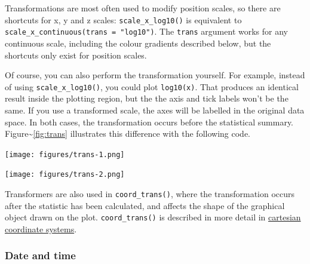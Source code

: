 Transformations are most often used to modify position scales, so there
are shortcuts for x, y and z scales: \texttt{scale\_x\_log10()} is
equivalent to \texttt{scale\_x\_continuous(trans = "log10")}. The
\texttt{trans} argument works for any continuous scale, including the
colour gradients described below, but the shortcuts only exist for
position scales.  

Of course, you can also perform the transformation yourself. For
example, instead of using \texttt{scale\_x\_log10()}, you could plot
\texttt{log10(x)}. That produces an identical result inside the plotting
region, but the the axis and tick labels won't be the same. If you use a
transformed scale, the axes will be labelled in the original data space.
In both cases, the transformation occurs before the statistical summary.
Figure\textasciitilde{}\ref{fig:trans} illustrates this difference with
the following code. 

\begin{Shaded}
\begin{Highlighting}[]
\NormalTok{(} 
\end{Highlighting}
\end{Shaded}

\texttt{[image: figures/trans-1.png]}

\begin{Shaded}
\begin{Highlighting}[]
 \StringTok{ }
\StringTok{  }\NormalTok{() +}\StringTok{ }\NormalTok{()}
\end{Highlighting}
\end{Shaded}

\texttt{[image: figures/trans-2.png]}

Transformers are also used in \texttt{coord\_trans()}, where the
transformation occurs after the statistic has been calculated, and
affects the shape of the graphical object drawn on the plot.
\texttt{coord\_trans()} is described in more detail in
\hyperref[sub:cartesian]{cartesian coordinate systems}.

\subsubsection{Date and time}\label{ssub:scale-date}

